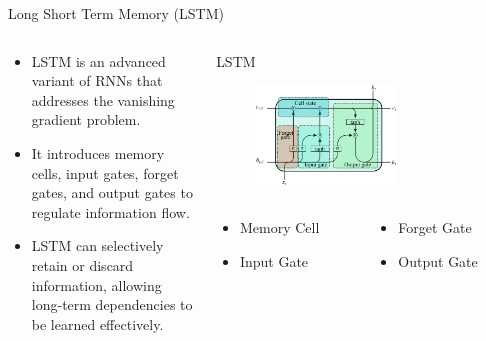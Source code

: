 \documentclass[10pt,aspectratio=169,dvipsnames]{beamer} %
\begin{document}
	\begin{frame}{Long Short Term Memory (LSTM)}
		\begin{columns}[T]
			\begin{column}[c]{0.45\textwidth}
				\begin{itemize}
					\item LSTM is an advanced variant of RNNs that addresses the vanishing gradient problem.
					\item It introduces memory cells, input gates, forget gates, and output gates to regulate information flow.
					\item LSTM can selectively retain or discard information, allowing long-term dependencies to be learned effectively.
				\end{itemize}
			\end{column}
			\begin{column}[c]{0.55\textwidth}
				\begin{block}{LSTM}
					\begin{figure}
						\includegraphics[width=0.65\textwidth]{lstm.png}
					\end{figure}
				\begin{columns}
					\begin{column}[c]{0.45\textwidth}
						\begin{itemize}
							\item \alert{Memory Cell}
							\item \alert{Input Gate}
						\end{itemize}
					\end{column}
					\begin{column}[c]{0.45\textwidth}
						\begin{itemize}					
							\item \alert{Forget Gate}
							\item \alert{Output Gate}
						\end{itemize}
					\end{column}
				\end{columns}					
				\end{block}				
			\end{column}
		\end{columns}
	\end{frame}
\end{document}
